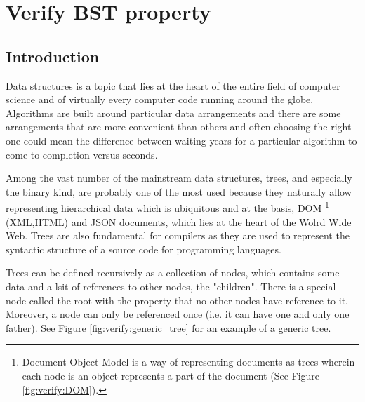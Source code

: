 %

\chapter{Verify BST property}
\label{ch:verify_BST}
\section*{Introduction}
Data structures is a topic that lies at the heart of the entire field of computer science and of virtually every computer code running around the globe.
Algorithms are built around particular data arrangements and there are some arrangements that are more convenient than others 
and often choosing the right one could mean the difference between waiting years for a particular algorithm to come to completion versus seconds. 

Among the vast number of the mainstream data structures, trees, and especially the binary kind, are probably one of the most used because they naturally allow representing hierarchical data which is ubiquitous and at the basis, DOM \footnote{Document Object Model is a way of representing documents as trees wherein each node is an object represents a part of the document (See Figure \ref{fig:verify:DOM}).} (XML,HTML) and  JSON documents, which lies at the heart of the Wolrd Wide Web.
Trees are also fundamental for compilers as they are used to represent the syntactic structure of a source code for programming languages.

Trees can be defined recursively as a collection of nodes, which contains some data and a lsit of references to other nodes, the "children". There is a special node called the root with the property that no other nodes have reference to it. Moreover, a node can only be referenced once (i.e. it can have one and only one father). See Figure \ref{fig:verify:generic_tree} for an example of a generic tree.



